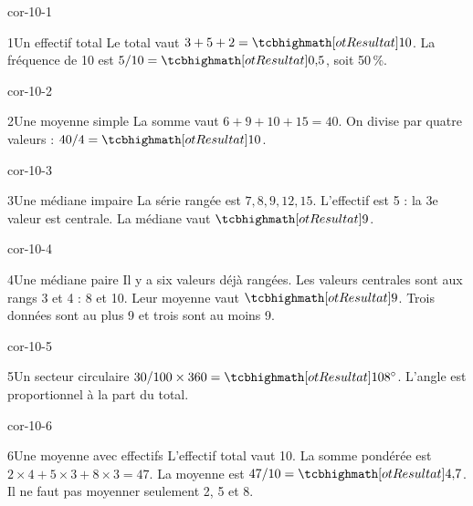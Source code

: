 \clearpage\pagestyle{otMain}\setlength{\otBlocEspacement}{2.5mm}\fontsize{11}{15}\selectfont{}
\begin{blocLivre}{cor-10-1}\begin{corrige}{1}{Un effectif total}
Le total vaut $3+5+2=\res{10}$. La fréquence de 10 est $5/10=\res{0{,}5}$, soit 50\,\%.
\end{corrige}\end{blocLivre}
\begin{blocLivre}{cor-10-2}\begin{corrige}{2}{Une moyenne simple}
La somme vaut $6+9+10+15=40$. On divise par quatre valeurs : $40/4=\res{10}$.
\end{corrige}\end{blocLivre}
\begin{blocLivre}{cor-10-3}\begin{corrige}{3}{Une médiane impaire}
La série rangée est $7,8,9,12,15$. L’effectif est 5 : la 3e valeur est centrale. La médiane vaut $\res9$.
\end{corrige}\end{blocLivre}
\begin{blocLivre}{cor-10-4}\begin{corrige}{4}{Une médiane paire}
Il y a six valeurs déjà rangées. Les valeurs centrales sont aux rangs 3 et 4 : 8 et 10. Leur moyenne vaut $\res9$. Trois données sont au plus 9 et trois sont au moins 9.
\end{corrige}\end{blocLivre}
\begin{blocLivre}{cor-10-5}\begin{corrige}{5}{Un secteur circulaire}
$30/100\times360=\res{108^\circ}$. L’angle est proportionnel à la part du total.
\end{corrige}\end{blocLivre}
\begin{blocLivre}{cor-10-6}\begin{corrige}{6}{Une moyenne avec effectifs}
L’effectif total vaut 10. La somme pondérée est $2\times4+5\times3+8\times3=47$. La moyenne est $47/10=\res{4{,}7}$. Il ne faut pas moyenner seulement 2, 5 et 8.
\end{corrige}\end{blocLivre}
